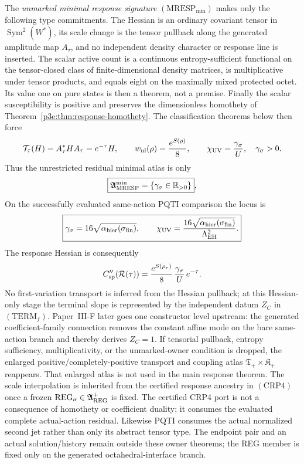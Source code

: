 \documentclass[12pt,a4paper]{article}
\begin{document}
\begin{definition}
\begin{enumerate}[label=(\roman*)]
The \emph{unmarked minimal response signature}
\((\mathrm{MRESP}_{\min})\) makes only the following type commitments.
The Hessian is an ordinary covariant tensor in
\(\operatorname{Sym}^2(W^*)\), its scale change is the tensor pullback along
the generated amplitude map \(A_\tau\), and no independent density character
or response line is inserted.  The scalar active count is a continuous
entropy-sufficient functional on the tensor-closed class of
finite-dimensional density matrices, is multiplicative under tensor products,
and equals eight on the maximally mixed protected octet.  Its value one on
pure states is then a theorem, not a premise.  Finally the scalar susceptibility is
positive and preserves the dimensionless homothety of
Theorem~\ref{p3e:thm:response-homothety}.  The classification theorems below
then force
\[
 \mathcal T_\tau(H)=A_\tau^*HA_\tau=e^{-\tau}H,
 \qquad
 w_{\rm nl}(\rho)=\frac{e^{S(\rho)}}8,
 \qquad
 \chi_{\rm UV}=\frac{\gamma_\sigma}{U},\quad \gamma_\sigma>0.
\]
Thus the unrestricted residual minimal atlas is only
\[
 \boxed{\mathfrak A_{\rm MRESP}^{\min}
 =\{\gamma_\sigma\in\mathbb R_{>0}\}},
\]
On the successfully evaluated same-action PQTI comparison the locus is
\[
 \boxed{\gamma_\sigma
 =16\sqrt{\alpha_{\rm hier}(\sigma_{\rm fin})},\qquad
 \chi_{\rm UV}
 =\frac{16\sqrt{\alpha_{\rm hier}(\sigma_{\rm fin})}}
        {\Lambda_{\rm EH}^2}.}
\]
The response Hessian is consequently
\[
 C_{\rm sp}''(\mathcal R(\tau))
 =\frac{e^{S(\rho_\tau)}}8\,
   \frac{\gamma_\sigma}{U}\,e^{-\tau}.
\]
No first-variation transport is inferred from the Hessian pullback; at this
Hessian-only stage the terminal slope is represented by the independent datum
\(Z_C\) in \((\mathrm{TERM}_f)\).  Paper~III-F later goes one constructor
level upstream: the generated coefficient-family connection removes the
constant affine mode on the bare same-action branch and thereby derives
\(Z_C=1\).  If tensorial pullback, entropy sufficiency,
multiplicativity, or the unmarked-owner condition is dropped, the enlarged
positive/completely-positive transport and coupling atlas
\(\mathfrak T_+\times\mathfrak K_+\) reappears.  That enlarged atlas is not
used in the main response theorem.  The scale interpolation is inherited from
the certified response ancestry in \((\mathrm{CRP4})\) once a frozen
\(\mathrm{REG}_{\sigma}\in\mathfrak A_{\rm REG}^{+}\) is fixed.  The certified CRP4 port is
not a consequence of homothety or coefficient duality; it consumes the
evaluated complete actual-action residual. Likewise PQTI consumes the
actual normalized second jet rather than only its abstract tensor type.  The endpoint pair and an
actual solution/history remain outside these owner theorems; the REG member
is fixed only on the generated octahedral-interface branch.


\end{enumerate}
\end{definition}
\end{document}

